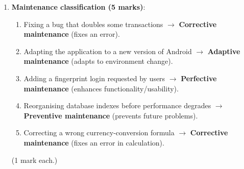 \documentclass[11pt]{article}
\begin{document}
\begin{corrige}
\begin{enumerate}
\item \textbf{Maintenance classification (5 marks)}:
\begin{enumerate}
\item Fixing a bug that doubles some transactions $\rightarrow$ \textbf{Corrective maintenance} (fixes an error).
\item Adapting the application to a new version of Android $\rightarrow$ \textbf{Adaptive maintenance} (adapts to environment change).
\item Adding a fingerprint login requested by users $\rightarrow$ \textbf{Perfective maintenance} (enhances functionality/usability).
\item Reorganising database indexes before performance degrades $\rightarrow$ \textbf{Preventive maintenance} (prevents future problems).
\item Correcting a wrong currency-conversion formula $\rightarrow$ \textbf{Corrective maintenance} (fixes an error in calculation).
\end{enumerate}
(1 mark each.)
\end{enumerate}
\end{corrige}
\end{document}
